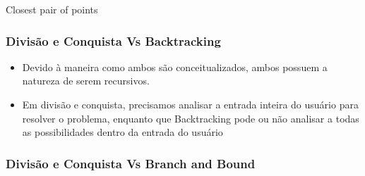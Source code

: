     \begin{algorithm}
        \caption{Closest pair of points} 
        \begin{algorithmic}[1]
        \EndIf
        \EndIf
        \EndIf
        \EndFor
        \EndProcedure
        \end{algorithmic}
      \end{algorithm}

      \subsubsection{Divisão e Conquista Vs Backtracking}

      \begin{itemize}
          \item Devido à maneira como ambos são conceitualizados, ambos possuem a 
          natureza de serem recursivos.
          \item Em divisão e conquista, precisamos analisar a entrada inteira do usuário 
          para resolver o problema, enquanto que Backtracking pode ou não analisar a todas 
          as possibilidades dentro da entrada do usuário
      \end{itemize}

      \subsubsection{Divisão e Conquista Vs Branch and Bound}

